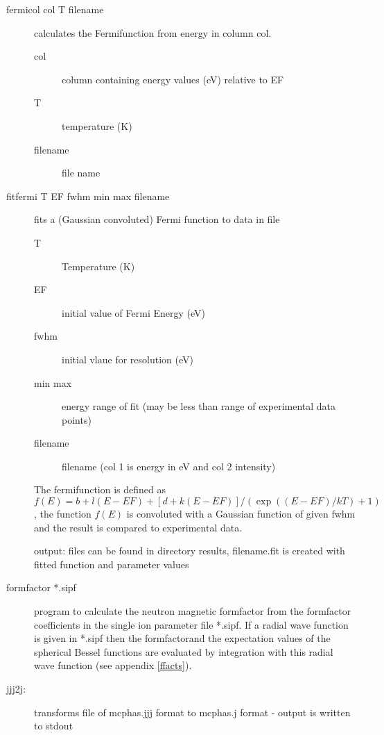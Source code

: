 \begin{description}
\item [\prg fermicol col T filename] calculates the Fermifunction from energy in column col.
\begin{description}
\item[col] column containing energy values (eV) relative to EF
 \item[T] temperature (K)
 \item[filename] file name
\end{description}
\item[\prg fitfermi T EF fwhm min max filename] 
fits a (Gaussian convoluted) Fermi function to data in file
\begin{description}
\item[T] Temperature (K)
\item[EF] initial value of Fermi Energy (eV)
\item[fwhm] initial vlaue for resolution (eV)
\item[min max] energy range of fit (may be less than range of experimental data points)
\item[filename] filename (col 1 is energy in eV and col 2 intensity)
\end{description}
The fermifunction is defined as
      $ f(E)=b+l(E-EF)+[d+k(E-EF)]/(\exp((E-EF)/kT)+1)$, the function
      $ f(E)$ is convoluted with a Gaussian function of given fwhm
            and the  result is compared to experimental data.

 output:  files can be found in directory results, filename.fit is created with fitted function and parameter values
\item[\prg formfactor *.sipf] program to calculate the neutron magnetic formfactor
from the formfactor coefficients in the single ion parameter file *.sipf. If a radial wave function is given in *.sipf
then the formfactorand the expectation values of the spherical Bessel functions  are evaluated by integration
with this radial wave function (see appendix \ref{ffacts}).
\item [\prg jjj2j:] transforms file of {\prg mcphas.jjj} format to {\prg %
mcphas.j} format
- output is written to stdout


\end{description}
